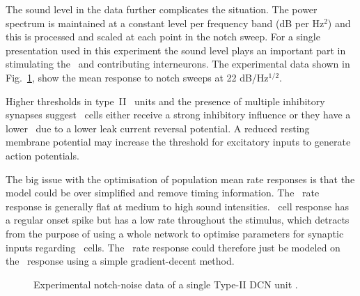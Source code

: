 
The sound level in the \citet{ReissYoung:2005} data further complicates the
situation.  The power spectrum is maintained at a constant level per frequency
band (dB per Hz$^2$) and this is processed and scaled at each point in the notch
sweep.  For a single presentation used in this experiment the sound level plays
an important part in stimulating the \ANFs~and contributing interneurons.  The
experimental data shown in Fig.~\ref{fig:TVReissFig9}, show the mean response to
notch sweeps at 22 dB/Hz$^{1/2}$.


Higher thresholds in type~II \DCN~units \citep{SpirouDavisEtAl:1999} and the
presence of multiple inhibitory synapses \citep{Alibardi:2006} suggest \TV~cells
either receive a strong inhibitory influence or they have a lower \RMP~due to a
lower leak current reversal potential. A reduced resting membrane potential may
increase the threshold for excitatory inputs to generate action potentials.



The big issue with the optimisation of population mean rate responses is that
the model could be over simplified and remove timing information.  The \HSR~rate
response is generally flat at medium to high sound intensities. \DS~cell
response has a regular onset spike but has a low rate throughout the stimulus,
which detracts from the purpose of using a whole network to optimise parameters
for synaptic inputs regarding \TV~cells.  The \TV~rate response could therefore
just be modeled on the \LSR~response using a simple gradient-decent
method. 
 


\begin{figure}[htb]
  \centering {}
  \caption[Experimental notch-noise data of a single Type-II DCN unit]{Experimental notch-noise data of a single Type-II DCN unit
    \citep[,~Fig.~9]{ReissYoung:2005}.}
  \label{fig:TVReissFig9}
\end{figure}


